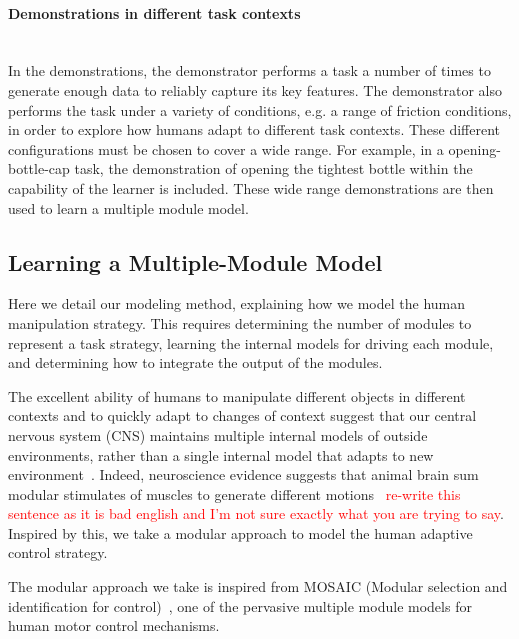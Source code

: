 \paragraph{Demonstrations in different task contexts}  ~\\
In the demonstrations, the demonstrator performs a task a number of
times to generate enough data to reliably capture its key features.
The demonstrator also performs the task under a variety of conditions, e.g. a range of friction conditions, in order to explore how humans adapt to different task contexts. These different configurations must be chosen to cover a wide range.
For example, in a opening-bottle-cap task, the demonstration of opening
the tightest bottle within the capability of the learner is
included. These wide range demonstrations are then used to learn a
multiple module model.

\subsection{Learning a Multiple-Module Model}
\label{cha4:sec2:learn}
Here we detail our modeling method, explaining how we model the human manipulation strategy.  This requires determining the number of modules to represent a task strategy, learning the internal models for driving each
module, and determining how to integrate the output of the modules.

The excellent ability of humans to manipulate different objects in different contexts and to quickly adapt to changes of context suggest that our central nervous system (CNS) maintains multiple internal models of outside environments, rather than a single internal model that adapts to new environment~\cite{neilson1985acquisition}. Indeed, neuroscience evidence suggests that animal brain sum modular stimulates of muscles to generate different motions~\cite{mussa1994linear}
\textcolor{red}{re-write this sentence as it is bad english and I'm not sure exactly what you are trying to say}.
Inspired by this, we take a modular approach to model the human adaptive control strategy.

The modular approach we take is inspired from MOSAIC (Modular selection and identification for control)~\cite{haruno2001mosaic}, one of the pervasive multiple module models for human motor control mechanisms.

